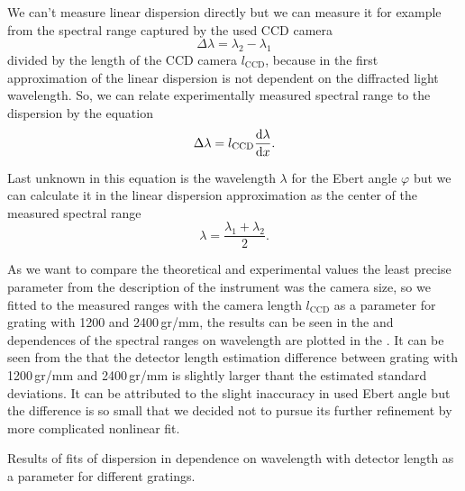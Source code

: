 We can't measure linear dispersion directly but we can measure it for example
from the spectral range captured by the used CCD camera
\begin{equation*}
	\Delta\lambda = \lambda_2 - \lambda_1
\end{equation*}
divided by the length of the CCD camera $l_\text{CCD}$, because in the first
approximation of
the linear dispersion is not dependent on the diffracted light wavelength. So,
we can relate experimentally measured spectral range to the dispersion by the
equation
\begin{equation}
	\Delta\lambda = l_\text{CCD}\frac{\text{d}\lambda}{\text{d}x}.
	\label{\eqnlabel{spectrograph_selection:measured_range}}
\end{equation}

Last unknown in this equation is the wavelength $\lambda$ for the Ebert angle
$\varphi$ but we can calculate it in the linear dispersion approximation as the
center of the measured spectral range
\begin{equation*}
	\lambda = \frac{\lambda_1 + \lambda_2}{2}.
\end{equation*}

As we want to compare the theoretical and experimental values the least precise
parameter from the description of the instrument was the camera size, so we
fitted
to the measured ranges with the camera length $l_\text{CCD}$ as a parameter for
grating with 1200 and 2400\,gr/mm, the results can be seen in the
and dependences of the spectral ranges on wavelength are plotted in the
.
It can be seen from the
that the detector length estimation difference between grating
with 1200\,gr/mm and 2400\,gr/mm is slightly larger thant the estimated
standard deviations. It can be attributed to the slight inaccuracy in used
Ebert angle but the difference is so small that we decided not to pursue its
further refinement by more complicated nonlinear fit.

\begin{table}
	\centering
	
	\caption{Results of fits of dispersion in dependence on wavelength with
		detector length as a parameter for different gratings.}
	\label{\tablabel{spectrograph_selection:detector_length_fits}}
\end{table}

